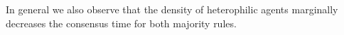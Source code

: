 \documentclass[a4paper,12pt]{scrartcl}
\newcommand{\figwidth}{0.49\linewidth}
\begin{document}
In general we also observe that the density of heterophilic agents marginally decreases the consensus time for both majority rules.

%
%
%
%
%




\end{document}

